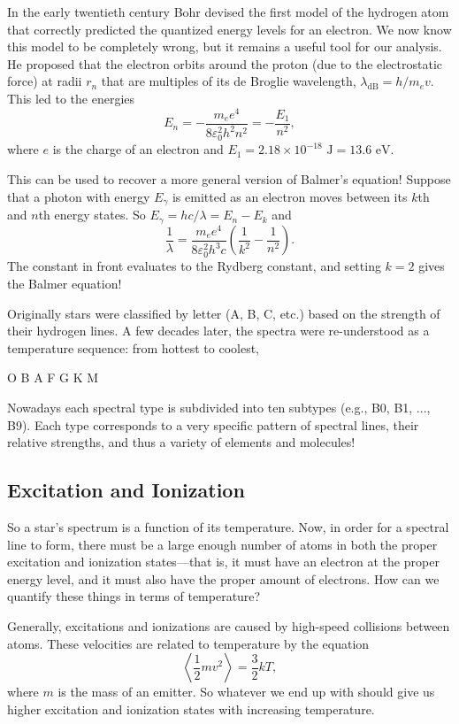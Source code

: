 \documentclass[../a062main.tex]{subfiles}
\begin{document}
In the early twentieth century Bohr devised the first model of the hydrogen atom that correctly predicted the quantized energy levels for an electron.
We now know this model to be completely wrong, but it remains a useful tool for our analysis.
He proposed that the electron orbits around the proton (due to the electrostatic force) at radii $r_n$ that are multiples of its de Broglie wavelength, $\lambda_\textrm{dB} = h / m_e v$.
This led to the energies
\[ \boxed{E_n = -\frac{m_e e^{4}}{8 \varepsilon_0^2 h^2 n^2} = -\frac{E_1}{n^2}}, \]
where $e$ is the charge of an electron and $E_1 = 2.18 \times 10^{-18} \textrm{ J} = 13.6 \textrm{ eV}$.

This can be used to recover a more general version of Balmer's equation!
Suppose that a photon with energy $E_\gamma$ is emitted as an electron moves between its $k$th and $n$th energy states.
So $E_\gamma = hc / \lambda = E_n - E_k$ and
\[ \frac{1}{\lambda} = \frac{m_e e^{4}}{8 \varepsilon_0^2 h^3 c} \left( \frac{1}{k^2} - \frac{1}{n^2} \right). \]
The constant in front evaluates to the Rydberg constant, and setting $k=2$ gives the Balmer equation!

Originally stars were classified by letter (A, B, C, etc.) based on the strength of their hydrogen lines.
A few decades later, the spectra were re-understood as a temperature sequence: from hottest to coolest,
\begin{center}
    O B A F G K M
\end{center}
Nowadays each spectral type is subdivided into ten subtypes (e.g., B0, B1, ..., B9).
Each type corresponds to a very specific pattern of spectral lines, their relative strengths, and thus a variety of elements and molecules!

\subsection*{Excitation and Ionization}
So a star's spectrum is a function of its temperature.
Now, in order for a spectral line to form, there must be a large enough number of atoms in both the proper excitation and ionization states---that is, it must have an electron at the proper energy level, and it must also have the proper amount of electrons.
How can we quantify these things in terms of temperature?

Generally, excitations and ionizations are caused by high-speed collisions between atoms.
These velocities are related to temperature by the equation
\[ \left< \frac{1}{2}mv^2 \right> = \frac{3}{2} kT, \]
where $m$ is the mass of an emitter.
So whatever we end up with should give us higher excitation and ionization states with increasing temperature.
\end{document}
